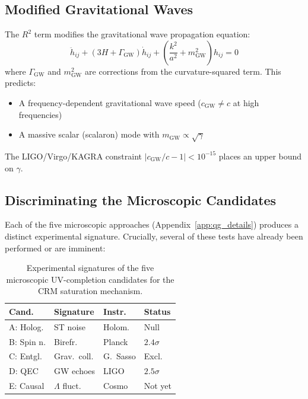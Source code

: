 \documentclass[aps,prd,twocolumn,superscriptaddress,nofootinbib]{revtex4-2}
\begin{document}
\subsection{Modified Gravitational Waves}

The $R^2$ term modifies the gravitational wave propagation equation:
\begin{equation}
\ddot{h}_{ij} + (3H + \Gamma_{\mathrm{GW}})\dot{h}_{ij} + \left(\frac{k^2}{a^2} + m_{\mathrm{GW}}^2\right) h_{ij} = 0
\end{equation}
where $\Gamma_{\mathrm{GW}}$ and $m_{\mathrm{GW}}^2$ are corrections from the curvature-squared term. This predicts:
\begin{itemize}
\item A frequency-dependent gravitational wave speed ($c_{\mathrm{GW}} \neq c$ at high frequencies)
\item A massive scalar (scalaron) mode with $m_{\mathrm{GW}} \propto \sqrt{\gamma}$
\end{itemize}
The LIGO/Virgo/KAGRA constraint $|c_{\mathrm{GW}}/c - 1| < 10^{-15}$ \cite{Abbott2017} places an upper bound on $\gamma$.

\subsection{Discriminating the Microscopic Candidates}

Each of the five microscopic approaches (Appendix~\ref{app:qg_details}) produces a distinct experimental signature. Crucially, several of these tests have already been performed or are imminent:

\begin{table}[h]
\centering
\caption{Experimental signatures of the five microscopic UV-completion candidates for the CRM saturation mechanism.}
\label{tab:uv_tests}
\footnotesize
\begin{tabular}{llll}
\toprule
\textbf{Cand.} & \textbf{Signature} & \textbf{Instr.} & \textbf{Status} \\
\midrule
A: Holog. & ST noise & Holom. & Null \\
B: Spin n. & Birefr. & Planck & $2.4\sigma$ \\
C: Entgl. & Grav.\ coll. & G.\ Sasso & Excl. \\
D: QEC & GW echoes & LIGO & $2.5\sigma$ \\
E: Causal & $\Lambda$ fluct. & Cosmo & Not yet \\
\bottomrule
\end{tabular}
\end{table}
\end{document}
